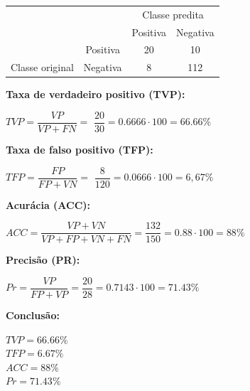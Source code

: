 \documentclass{article}
\begin{document}
\begin{center}
  \begin{table}[H]
    \centering
      \begin{tabular}{ll|c|c|}
      \cline{3-4}
                                                                                      &                                                       & \multicolumn{2}{c|}{\cellcolor[HTML]{C0C0C0}Classe predita}         \\ \cline{3-4} 
                                                                                      &                                                       & \cellcolor[HTML]{C0C0C0}Positiva & \cellcolor[HTML]{C0C0C0}Negativa \\ \hline
      \multicolumn{1}{|c|}{\cellcolor[HTML]{C0C0C0}}                                  & \multicolumn{1}{c|}{\cellcolor[HTML]{C0C0C0}Positiva} & 20                               & 10                               \\ \cline{2-4} 
      \multicolumn{1}{|c|}{\multirow{-2}{*}{\cellcolor[HTML]{C0C0C0}Classe original}} & \multicolumn{1}{c|}{\cellcolor[HTML]{C0C0C0}Negativa} & 8                                & 112                               \\ \hline
    \end{tabular}
  \end{table}
\end{center}

\textbf{Taxa de verdadeiro positivo (TVP):} 
\begin{center}
  $TVP = \dfrac{VP}{VP + FN} = $
  $\dfrac{20}{30} = 0.6666 \cdot 100 = 66.66\%$    
\end{center}

\textbf{Taxa de falso positivo (TFP):} 
\begin{center}
  $TFP = \dfrac{FP}{FP + VN} = $
  $\dfrac{8}{120} = 0.0666 \cdot 100 = 6,67\%$
\end{center}

\textbf{Acurácia (ACC):} 
\begin{center}
  $ACC = \dfrac{VP + VN}{VP+FP+VN+FN} = \dfrac{132}{150} = 0.88 \cdot 100 = 88\%$
\end{center}

\textbf{Precisão (PR):} 
\begin{center}
  $Pr = \dfrac{VP}{FP + VP} = \dfrac{20}{28} = 0.7143 \cdot 100 = 71.43\%$
\end{center}

\textbf{Conclusão:}
\begin{center}
  $\textit{TVP} = 66.66\%$ \\
  $\textit{TFP} = 6.67\%$ \\
  $\textit{ACC} = 88\%$ \\
  $\textit{Pr} = 71.43\%$
\end{center}
\end{document}
